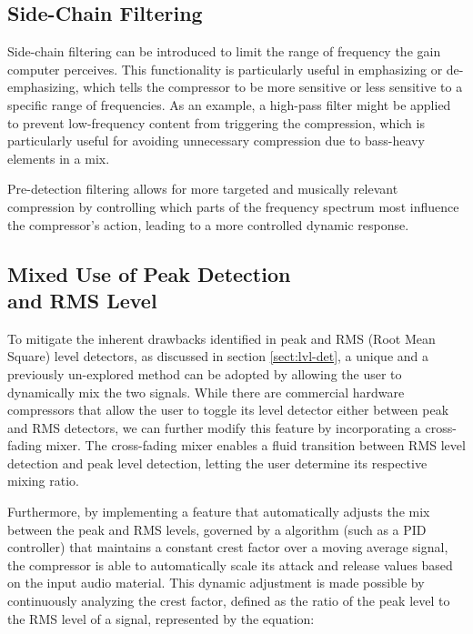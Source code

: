 \documentclass[10pt]{article}
\begin{document}
\begin{multicols*}{2}
            \subsection{Side-Chain Filtering}
                Side-chain filtering can be introduced to limit the range of frequency the gain computer perceives. This functionality is particularly useful in emphasizing or de-emphasizing, which tells the compressor to be more sensitive or less sensitive to a specific range of frequencies.
                As an example, a high-pass filter might be applied to prevent low-frequency content from triggering the compression, which is particularly useful for avoiding unnecessary compression due to bass-heavy elements in a mix. \cite{side-chain-filtering}\par
                Pre-detection filtering allows for more targeted and musically relevant compression by controlling which parts of the frequency spectrum most influence the compressor's action, leading to a more controlled dynamic response.
                
            \subsection[Mixed Use of Peak Detection and RMS Level]{Mixed Use of Peak Detection\\and RMS Level} \label{sect:rms-peak-mix}
                To mitigate the inherent drawbacks identified in peak and RMS (Root Mean Square) level detectors, as discussed in section \ref{sect:lvl-det}, a unique and a previously un-explored method can be adopted by allowing the user to dynamically mix the two signals. While there are commercial hardware compressors that allow the user to toggle its level detector either between peak and RMS detectors, we can further modify this feature by incorporating a cross-fading mixer. The cross-fading mixer enables a fluid transition between RMS level detection and peak level detection, letting the user determine its respective mixing ratio.\par
                Furthermore, by implementing a feature that automatically adjusts the mix between the peak and RMS levels, governed by a algorithm (such as a PID controller) that maintains a constant crest factor over a moving average signal, the compressor is able to automatically scale its attack and release values based on the input audio material. This dynamic adjustment is made possible by continuously analyzing the crest factor, defined as the ratio of the peak level to the RMS level of a signal, represented by the equation:


\end{multicols*}
\end{document}
